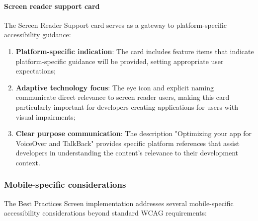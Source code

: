 \paragraph{Screen reader support card}

The Screen Reader Support card serves as a gateway to platform-specific accessibility guidance:

\begin{enumerate}
    \item \textbf{Platform-specific indication}: The card includes feature items that indicate platform-specific guidance will be provided, setting appropriate user expectations;
    
    \item \textbf{Adaptive technology focus}: The eye icon and explicit naming communicate direct relevance to screen reader users, making this card particularly important for developers creating applications for users with visual impairments;
    
    \item \textbf{Clear purpose communication}: The description "Optimizing your app for VoiceOver and TalkBack" provides specific platform references that assist developers in understanding the content's relevance to their development context.
\end{enumerate}

\subsubsection{Mobile-specific considerations}

The Best Practices Screen implementation addresses several mobile-specific accessibility considerations beyond standard WCAG requirements:

